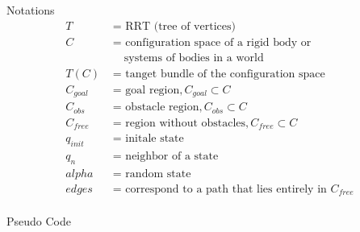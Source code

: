 \documentclass[%
  professionalfonts,%
  xcolor={%
    usenames,%
    dvipsnames,%
    svgnames,%
    table,%
    hyperref%
  }%
]{beamer}
\begin{document}
      \begin{frame}{Notations}
        \begin{align*}
        T        & \text{ = RRT (tree of vertices)}\\
        C        & \text{ = configuration space of a rigid body or}\\
                 & \text{ ~~ systems of bodies in a world}\\
        T(C)     & \text{ = tanget bundle of the configuration space}\\
        C_{goal} & \text{ = goal region},  C_{goal} \subset C\\
        C_{obs}  & \text{ = obstacle region},  C_{obs} \subset C\\
        C_{free} & \text{ = region without obstacles}, C_{free} \subset C\\
        q_{init} & \text{ = initale state}\\
        q_n      & \text{ = neighbor of a state}\\
        alpha    & \text{ = random state}\\
        edges    & \text{ = correspond to a path that lies entirely in } C_{free}\\
        \end{align*}
      \end{frame}
      
      \begin{frame}{Pseudo Code}
        
      \end{frame}
      
      
\end{document}
